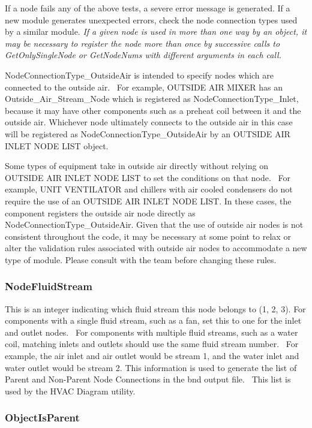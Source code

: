 If a node fails any of the above tests, a severe error message is generated. If a new module generates unexpected errors, check the node connection types used by a similar module. \emph{If a given node is used in more than one way by an object, it may be necessary to register the node more than once by successive calls to GetOnlySingleNode or GetNodeNums with different arguments in each call.}

NodeConnectionType\_OutsideAir is intended to specify nodes which are connected to the outside air.~ For example, OUTSIDE AIR MIXER has an Outside\_Air\_Stream\_Node which is registered as NodeConnectionType\_Inlet, because it may have other components such as a preheat coil between it and the outside air. Whichever node ultimately connects to the outside air in this case will be registered as NodeConnectionType\_OutsideAir by an OUTSIDE AIR INLET NODE LIST object.

Some types of equipment take in outside air directly without relying on OUTSIDE AIR INLET NODE LIST to set the conditions on that node.~ For example, UNIT VENTILATOR and chillers with air cooled condensers do not require the use of an OUTSIDE AIR INLET NODE LIST. In these cases, the component registers the outside air node directly as NodeConnectionType\_OutsideAir. Given that the use of outside air nodes is not consistent throughout the code, it may be necessary at some point to relax or alter the validation rules associated with outside air nodes to accommodate a new type of module. Please consult with the team before changing these rules.

\subsubsection{NodeFluidStream}\label{nodefluidstream}

This is an integer indicating which fluid stream this node belongs to (1, 2, 3). For components with a single fluid stream, such as a fan, set this to one for the inlet and outlet nodes.~ For components with multiple fluid streams, such as a water coil, matching inlets and outlets should use the same fluid stream number.~ For example, the air inlet and air outlet would be stream 1, and the water inlet and water outlet would be stream 2. This information is used to generate the list of Parent and Non-Parent Node Connections in the bnd output file.~ This list is used by the HVAC Diagram utility.

\subsubsection{ObjectIsParent}\label{objectisparent}

